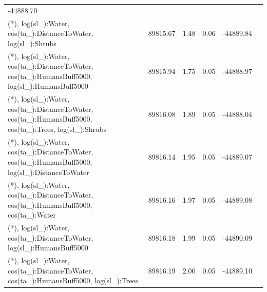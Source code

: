 \documentclass[abstract=on,10pt,a4paper,bibliography=totocnumbered]{scrartcl}
\begin{document}
\begin{table}[h]
\begin{center}
{\begin{tabular}{llllll}
                -44888.70 \\
        (*), log(sl\_):Water, cos(ta\_):DistanceToWater, log(sl\_):Shrubs &
          89815.67 &
            1.48 &
              0.06 &
                -44889.84 \\
        (*), log(sl\_):Water, cos(ta\_):DistanceToWater, cos(ta\_):HumansBuff5000, log(sl\_):HumansBuff5000 &
          89815.94 &
            1.75 &
              0.05 &
                -44888.97 \\
        (*), log(sl\_):Water, cos(ta\_):DistanceToWater, cos(ta\_):HumansBuff5000, cos(ta\_):Trees, log(sl\_):Shrubs &
          89816.08 &
            1.89 &
              0.05 &
                -44888.04 \\
        (*), log(sl\_):Water, cos(ta\_):DistanceToWater, cos(ta\_):HumansBuff5000, log(sl\_):DistanceToWater &
          89816.14 &
            1.95 &
              0.05 &
                -44889.07 \\
        (*), log(sl\_):Water, cos(ta\_):DistanceToWater, cos(ta\_):HumansBuff5000, cos(ta\_):Water &
          89816.16 &
            1.97 &
              0.05 &
                -44889.08 \\
        (*), log(sl\_):Water, cos(ta\_):DistanceToWater, log(sl\_):HumansBuff5000 &
          89816.18 &
            1.99 &
              0.05 &
                -44890.09 \\
        (*), log(sl\_):Water, cos(ta\_):DistanceToWater, cos(ta\_):HumansBuff5000, log(sl\_):Trees &
          89816.19 &
            2.00 &
              0.05 &
                -44889.10 \\
      \bottomrule
      \end{tabular}
    }
  \end{center}
\end{table}
\end{document}

